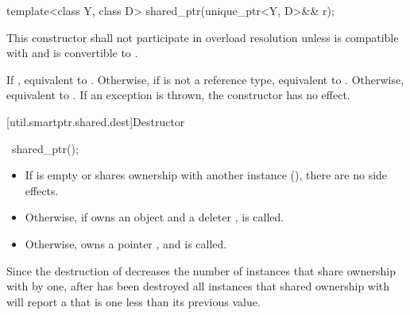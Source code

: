 %
%
\begin{itemdecl}
template<class Y, class D> shared_ptr(unique_ptr<Y, D>&& r);
\end{itemdecl}

\begin{itemdescr}
\pnum\remarks This constructor shall not participate in overload resolution
unless  is compatible with  and
 is convertible to .

\pnum
\effects If , equivalent to .
Otherwise, if  is not a reference type,
equivalent to .
Otherwise, equivalent to .
If an exception is thrown, the constructor has no effect.
\end{itemdescr}

[util.smartptr.shared.dest]{Destructor}

%
\begin{itemdecl}
~shared_ptr();
\end{itemdecl}

\begin{itemdescr}
\pnum\effects
\begin{itemize}
\item If  is empty or shares ownership with another
 instance (), there are no side effects.

\item
Otherwise, if  owns an object
 and a deleter ,  is called.

\item Otherwise,  owns a pointer ,
and  is called.
\end{itemize}
\end{itemdescr}

\pnum
\begin{note} Since the destruction of 
decreases the number of instances that share ownership with 
by one,
after  has been destroyed
all  instances that shared ownership with
 will report a  that is one less
than its previous value. \end{note}

